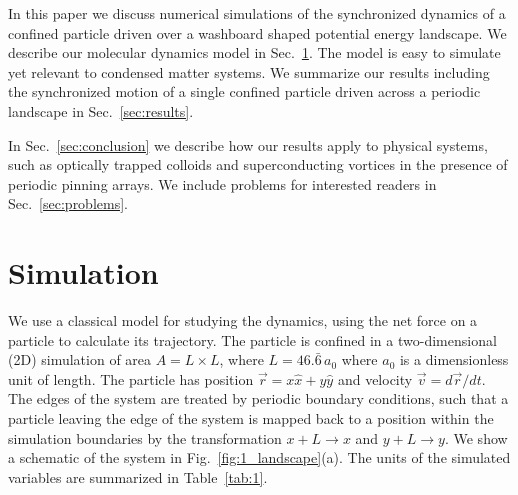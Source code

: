 \documentclass[preprint,showpacs,preprintnumbers,amsmath,amssymb,aps,prb]{revtex4-1}
\theoremstyle{remark}
\begin{document}
In this paper we discuss numerical simulations 
of the synchronized dynamics
of a confined particle driven over
a washboard shaped potential energy landscape.
We describe
our molecular dynamics model  in Sec.~\ref{sec:MD}.
The model
is easy to simulate yet relevant
to condensed matter systems.
We summarize our results 
including the synchronized motion of a single confined particle
driven across a periodic landscape in 
Sec.~\ref{sec:results}.

In Sec.~\ref{sec:conclusion}
we describe how our results apply 
to physical systems,
such as optically trapped colloids
and superconducting vortices in the presence of periodic pinning arrays.
We include problems for interested readers 
in Sec.~\ref{sec:problems}.

\section{Simulation}
\label{sec:MD}
We use a classical model for 
studying the dynamics, %
using the net force on a particle to calculate
its trajectory.
The particle is confined in a two-dimensional (2D) %
simulation of area $A = L \times L$, where $L=46.\bar{6}\,a_0$
where $a_0$ is a dimensionless unit of length.
The particle %
has
position $\vec{r} = x \hat{x} + y \hat{y}$
and velocity $\vec{v} = d\vec{r}/dt$.
The edges of the system are treated by
periodic boundary conditions,
such that a particle leaving the edge of the system is mapped
back to a position within the simulation boundaries 
by the transformation $x+L \rightarrow x$ and $y+L \rightarrow y$.
We show a schematic of the system in Fig.~\ref{fig:1_landscape}(a).
The units of the simulated variables are summarized in Table~\ref{tab:1}.
\end{document}
